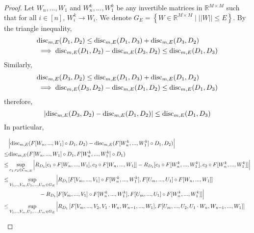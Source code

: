 \documentclass{article} %
\newcommand{\disc}{\textnormal{disc}}
\begin{document}
\begin{proof} Let $W_n,...,W_1$ and $W^k_n,...,W^k_1$ be any invertible matrices in $\mathbb{R}^{M\times M}$ such that for all $i \in [n]$, $W^k_i \to W_i$. We denote $G_E = \left\{W\in\mathbb{R}^{M\times M}  \; \big\vert \; ||W|| \leq E\right\}$. By the triangle inequality,
\begin{equation}
\begin{aligned}
&\disc_{m,E}(D_1,D_2) \leq \disc_{m,E}(D_1,D_3) + \disc_{m,E}(D_3,D_2) \\
&\implies \disc_{m,E}(D_1,D_2) - \disc_{m,E}(D_3,D_2) \leq \disc_{m,E}(D_1,D_3) 
\end{aligned}
\end{equation}
Similarly, 
\begin{equation}
\begin{aligned}
&\disc_{m,E}(D_3,D_2) \leq \disc_{m,E}(D_1,D_3) + \disc_{m,E}(D_1,D_2) \\
&\implies \disc_{m,E}(D_3,D_2) - \disc_{m,E}(D_1,D_2) \leq \disc_{m,E}(D_1,D_3) 
\end{aligned}
\end{equation}
therefore, 
\begin{equation}
|\disc_{m,E}(D_3,D_2) - \disc_{m,E}(D_1,D_2)| \leq \disc_{m,E}(D_1,D_3) 
\end{equation}
In particular, 
\begin{small}
\begin{equation}
\begin{aligned}
&\Big\vert \disc_{m,E}(F[W_{n},...,W_1] \circ D_1,D_2) - \disc_{m,E}(F[W^k_{n},...,W^k_1] \circ D_1,D_2) \Big\vert \\
\leq & \disc_{m,E}(F[W_{n},...,W_1]\circ D_1, F[W^k_{n},...,W^k_1] \circ D_1) \\
\leq & \sup_{c_1,c_2 \in \mathcal{C}_{m,E}}\Big\vert R_{D_1}[c_1 \circ F[W_{n},...,W_1] ,c_2 \circ F[W_{n},...,W_1]]- R_{D_1}[c_1 \circ F[W^k_n,...,W^k_1] ,c_2 \circ F[W^k_n,...,W^k_1] ] \Big\vert \\
\leq & \sup_{V_1,..,V_m,U_1,...,U_m \in G_{E}}\Big\vert R_{D_1}[F[V_m,...,V_1] \circ F[W^k_{n},...,W^k_1] ,F[U_m,...,U_1] \circ F[W_{n},...,W_1] ] \\
&\;\;\;\;\;\;\;\;\;\;\;\;\;\;\;\;\;\;\;\; - R_{D_1}[F[V_m,...,V_1] \circ F[W^k_{n},...,W^k_1] , F[U_m,...,U_1] \circ F[W^k_{n},...,W^k_1] ] \Big\vert \\
\leq & \sup_{V_1,..,V_m,U_1,...,U_m \in G_{E}}\Big\vert R_{D_1}\left[ F[V_m,...,V_2,V_1\cdot W_{n},W_{n-1},...,W_1 ] ,F[U_m,...,U_2,U_1\cdot W_{n},W_{n-1},...,W_1] \right] \\

\end{aligned}
\end{equation}
\end{small}
\end{proof}
\end{document}
